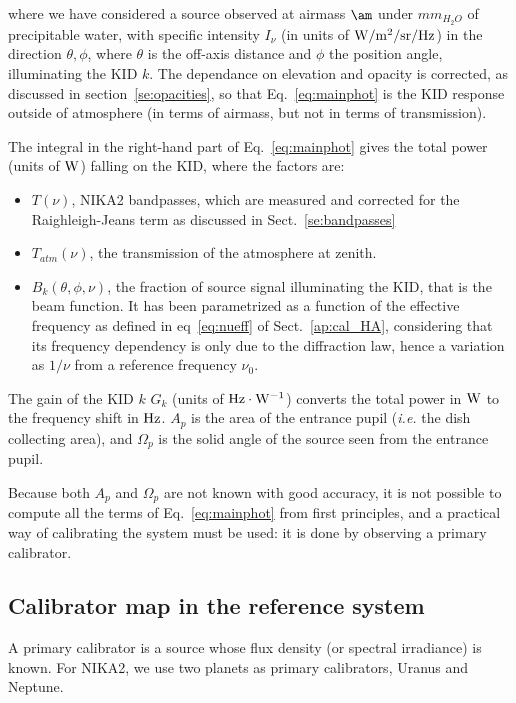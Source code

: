 where we have considered a source observed at airmass $\am$ under
$mm_{H_{2}O}$ of precipitable water, with specific intensity $I_{\nu}$ (in units
of  ${\rm W/m^{2}/sr/Hz}$) in the direction $\theta, \phi$, where $\theta$
is the off-axis distance and $\phi$ the position angle, illuminating the KID $k$. 
The dependance on elevation and opacity is corrected, as discussed in
section~\ref{se:opacities}, so that Eq.~\ref{eq:mainphot} is the KID
response outside of atmosphere (in terms of airmass, but not in terms
of transmission).

The integral in the right-hand part of Eq.~\ref{eq:mainphot} gives the total power (units of $\rm W$)
falling on the KID, where the factors are:
\begin{itemize}
\item $T(\nu)$, NIKA2 bandpasses, which are measured and corrected for the Raighleigh-Jeans term as discussed in Sect.~\ref{se:bandpasses}
\item $T_{atm}(\nu)$, the transmission of the atmosphere at zenith. 
\item $B_{k} (\theta, \phi, \nu)$, the fraction of source signal illuminating the KID, that is the beam function. It has been parametrized as a function of the effective frequency as defined in eq~\ref{eq:nueff} of Sect.~\ref{ap:cal_HA},
considering that its frequency dependency is only due to the diffraction law, hence a variation as $1/\nu$ from a reference frequency $\nu_0$.  
\end{itemize}

The gain of the KID $k$ $G_{k}$ (units of  $\rm Hz \cdot \rm W^{-1}$) converts the total power in $\rm W$
to the frequency shift in $\rm Hz$. $A_{p}$ is the area of the entrance pupil ({\it i.e.} the
dish collecting area), and $\Omega_{p}$ is the solid angle of the source seen from the
entrance pupil.

Because both $A_{p}$ and $ \Omega_{p} $ are not known with good
accuracy, it is not possible to compute all the terms of
Eq.~\ref{eq:mainphot} from first principles, and a practical way of
calibrating the system must be used: it is done by observing a primary
calibrator.


\subsection{Calibrator map in the reference system}

A primary calibrator is a source whose flux density (or spectral irradiance) is
known. For NIKA2, we use two planets as primary calibrators, Uranus
and Neptune.

